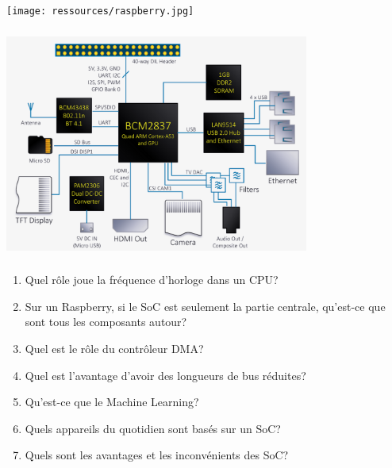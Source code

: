 \documentclass[svgnames,11pt]{beamer}
\begin{document}
\begin{frame}
    \frametitle{}

    \begin{center}
        \texttt{[image: ressources/raspberry.jpg]}
    \end{center}

\end{frame}
\begin{frame}
    \frametitle{}
\begin{center}
\centering
\includegraphics[width=10cm]{ressources/raspberry-schema.png}
\label{IMG}
\end{center}

\end{frame}
\begin{frame}
    \frametitle{}

    \begin{activite}
    \begin{enumerate}
        \item Quel rôle joue la fréquence d'horloge dans un CPU?
        \item Sur un Raspberry, si le SoC est seulement la partie centrale, qu'est-ce que sont tous les composants autour?
        \item Quel est le rôle du contrôleur DMA?
        \item Quel est l'avantage d'avoir des longueurs de bus réduites?
        \item Qu'est-ce que le Machine Learning?
        \item Quels appareils du quotidien sont basés sur un SoC?
        \item Quels sont les avantages et les inconvénients des SoC?
    \end{enumerate}
    \end{activite}
\end{frame}
\end{document}
